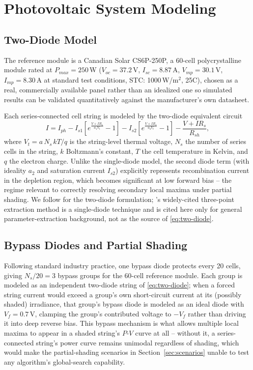 \section{Photovoltaic System Modeling}
\label{sec:pv-model}

\subsection{Two-Diode Model}
The reference module is a Canadian Solar CS6P-250P, a 60-cell polycrystalline
module rated at $P_{max}=250\,$W ($V_{oc}=37.2\,$V, $I_{sc}=8.87\,$A,
$V_{mp}=30.1\,$V, $I_{mp}=8.30\,$A at standard test conditions, STC:
1000\,W/m$^2$, 25\textdegree C), chosen as a real, commercially available
panel rather than an idealized one so simulated results can be validated
quantitatively against the manufacturer's own datasheet.

Each series-connected cell string is modeled by the two-diode equivalent
circuit
\begin{equation}
I = I_{ph} - I_{s1}\!\left[e^{\frac{V+IR_s}{a_1 V_t}} - 1\right]
          - I_{s2}\!\left[e^{\frac{V+IR_s}{a_2 V_t}} - 1\right]
          - \frac{V+IR_s}{R_{sh}},
\label{eq:two-diode}
\end{equation}
where $V_t = a\,N_s\,kT/q$ is the string-level thermal voltage, $N_s$ the
number of series cells in the string, $k$ Boltzmann's constant, $T$ the
cell temperature in Kelvin, and $q$ the electron charge. Unlike the
single-diode model, the second diode term (with ideality $a_2$ and
saturation current $I_{s2}$) explicitly represents recombination current in
the depletion region, which becomes significant at low forward bias -- the
regime relevant to correctly resolving secondary local maxima under partial
shading. We follow \cite{ishaque2011simple} for the two-diode formulation;
\cite{villalva2009comprehensive}'s widely-cited three-point extraction
method is a single-diode technique and is cited here only for general
parameter-extraction background, not as the source of
\eqref{eq:two-diode}.

\subsection{Bypass Diodes and Partial Shading}
Following standard industry practice, one bypass diode protects every 20
cells, giving $N_s/20=3$ bypass groups for the 60-cell reference module.
Each group is modeled as an independent two-diode string of
\eqref{eq:two-diode}; when a forced string current would exceed a group's
own short-circuit current at its (possibly shaded) irradiance, that group's
bypass diode is modeled as an ideal diode with $V_f=0.7\,$V, clamping the
group's contributed voltage to $-V_f$ rather than driving it into deep
reverse bias. This bypass mechanism is what allows multiple local maxima to
appear in a shaded string's $P$-$V$ curve at all -- without it, a
series-connected string's power curve remains unimodal regardless of
shading, which would make the partial-shading scenarios in
Section~\ref{sec:scenarios} unable to test any algorithm's global-search
capability.

